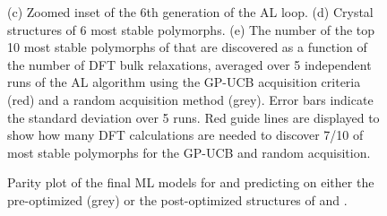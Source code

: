 \begin{figure}[!htb]
{%
(c) Zoomed inset of the 6th generation of the AL loop.
(d) Crystal structures of \num{6} most stable \IrOthree polymorphs.
(e) The number of the top \num{10} most stable polymorphs of \IrOthree that are discovered as a function of the number of DFT bulk relaxations, averaged over \num{5} independent runs of the AL algorithm using the GP-UCB acquisition criteria (red) and a random acquisition method (grey).
%
Error bars indicate the standard deviation over \num{5} runs.
%
Red guide lines are displayed to show how many DFT calculations are needed to discover \num{7/10} of most stable polymorphs for the GP-UCB and random acquisition.
}
\end{figure}


\begin{figure}[!htb]
\centering
{}
\caption{\label{fig:parity}
%
Parity plot of the final ML models for \IrOtwo and \IrOthree predicting on either the pre-optimized (grey) or the post-optimized structures of \IrOtwo and \IrOthree.
}
\end{figure}



